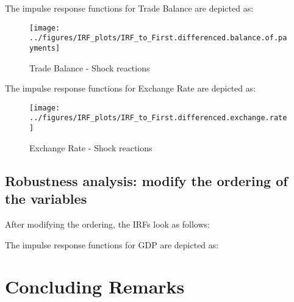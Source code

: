 \documentclass[
]{article}
\begin{document}
The impulse response functions for Trade Balance are depicted as:

\begin{figure}

{\centering \texttt{[image: ../figures/IRF\_plots/IRF\_to\_First.differenced.balance.of.payments]} 

}

\caption{Trade Balance - Shock reactions}\label{fig:unnamed-chunk-25}
\end{figure}

The impulse response functions for Exchange Rate are depicted as:

\begin{figure}

{\centering \texttt{[image: ../figures/IRF\_plots/IRF\_to\_First.differenced.exchange.rate]} 

}

\caption{Exchange Rate - Shock reactions}\label{fig:unnamed-chunk-26}
\end{figure}

\subsection{Robustness analysis: modify the ordering of the variables}

After modifying the ordering, the IRFs look as follows:

The impulse response functions for GDP are depicted as:















\section{Concluding Remarks}
\end{document}
